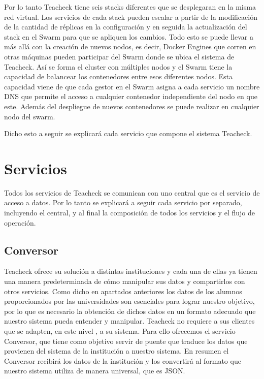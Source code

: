 Por lo tanto Teacheck tiene seis stacks diferentes que se desplegaran en la misma red virtual. Los servicios de cada stack pueden escalar a partir de la modificación de la cantidad de réplicas en la configuración y en seguida la actualización del stack en el Swarm para que se apliquen los cambios. Todo esto se puede llevar a más allá con la creación de nuevos nodos, es decir, Docker Engines que corren en otras máquinas pueden participar del Swarm donde se ubica el sistema de Teacheck. Así se forma el cluster con múltiples nodos y el Swarm tiene la capacidad de balancear los contenedores entre esos diferentes nodos. Esta capacidad viene de que cada gestor en el Swarm asigna a cada servicio un nombre DNS que permite el acceso a cualquier contenedor independiente del nodo en que este. Además del despliegue de nuevos contenedores se puede realizar en cualquier nodo del swarm.

Dicho esto a seguir se explicará cada servicio que compone el sistema Teacheck.

\section{Servicios}

Todos los servicios de Teacheck se comunican con uno central que es el servicio de acceso a datos. Por lo tanto se explicará a seguir cada servicio por separado, incluyendo el central, y al final la composición de todos los servicios y el flujo de operación.

\subsection{Conversor}

Teacheck ofrece su solución a distintas instituciones y cada una de ellas ya tienen una manera predeterminada de cómo manipular sus datos y compartirlos con otros servicios. Como dicho en apartados anteriores los datos de los alumnos proporcionados por las universidades son esenciales para lograr nuestro objetivo, por lo que es necesario la obtención de dichos datos en un formato adecuado que nuestro sistema pueda entender y manipular. Teacheck no requiere a sus clientes que se adapten, en este nivel , a su sistema. Para ello ofrecemos el servicio Conversor, que tiene como objetivo servir de puente que traduce los datos que provienen del sistema de la institución a nuestro sistema. En resumen el Conversor recibirá los datos de la institución y los convertirá al formato que nuestro sistema utiliza de manera universal, que es JSON.

